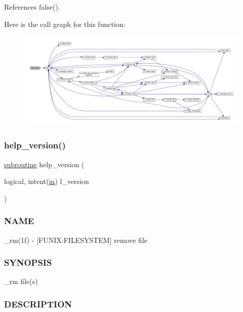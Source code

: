 References false().

Here is the call graph for this function\+:
\nopagebreak
\begin{figure}[H]
\begin{center}
\leavevmode
\includegraphics[width=350pt]{__rm_8f90_a3e09a3b52ee8fb04eeb93fe5761626a8_cgraph}
\end{center}
\end{figure}
\mbox{\label{__rm_8f90_a39c21619b08a3c22f19e2306efd7f766}} 
\subsubsection{\texorpdfstring{help\+\_\+version()}{help\_version()}}
{\footnotesize\ttfamily \hyperlink{M__stopwatch_83_8txt_acfbcff50169d691ff02d4a123ed70482}{subroutine} help\+\_\+version (\begin{DoxyParamCaption}\item[{logical, intent(\hyperlink{M__journal_83_8txt_afce72651d1eed785a2132bee863b2f38}{in})}]{l\+\_\+version }\end{DoxyParamCaption})}



\subsubsection*{N\+A\+ME}

\+\_\+rm(1f) -\/ \mbox{[}F\+U\+N\+IX\+:F\+I\+L\+E\+S\+Y\+S\+T\+EM\mbox{]} remove file \subsubsection*{S\+Y\+N\+O\+P\+S\+IS}

\+\_\+rm file(s) \subsubsection*{D\+E\+S\+C\+R\+I\+P\+T\+I\+ON}

